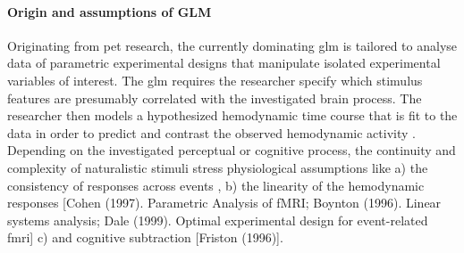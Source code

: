 \paragraph{Origin and assumptions of GLM}


%
Originating from \ac{pet} research, the currently dominating \ac{glm} is
tailored to analyse data of parametric experimental designs that
manipulate isolated experimental variables of interest.
%
The \ac{glm} requires the researcher specify which stimulus features are
presumably correlated with the investigated brain process.
%
The researcher then models a hypothesized hemodynamic time course that is fit to
the data in order to predict and contrast the observed hemodynamic activity
\citep{friston1998event}.
%
Depending on the investigated perceptual or cognitive process, the continuity
and complexity of naturalistic stimuli stress physiological assumptions like
%
a) the consistency of responses across events \citep[the basis for
\textit{trial-averaging};][]{dale1997selective},
%
b) the linearity of the hemodynamic responses [Cohen (1997). Parametric Analysis
of fMRI; Boynton (1996). Linear systems analysis; Dale (1999). Optimal
experimental design for event-related fmri]%
c) and cognitive subtraction [Friston (1996)].


